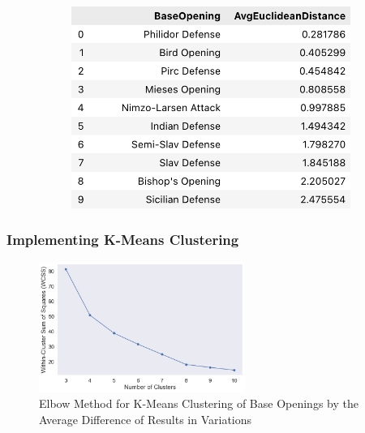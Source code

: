 \documentclass[a4paper, 11pt]{article}
\begin{document}
\begin{figure}[H]
\begin{subfigure}{0.49\textwidth}
        \includegraphics[width=\textwidth]{Top 10 Openings with Smallest Mean Difference in Variations.png}
    \end{subfigure}
\end{figure}

\subsubsection{Implementing K-Means Clustering}

\begin{figure}[H]
    \centering
    \caption{Elbow Method for K-Means Clustering of Base Openings by the Average Difference of Results in Variations}
    \label{fig:elbowMethodForBaseOpeningsClusteredByDifferenceInVariations}
    \includegraphics[width=0.6\textwidth]{Elbow Method for Clustering of Base Opening by Results.png}
\end{figure}
\end{document}
